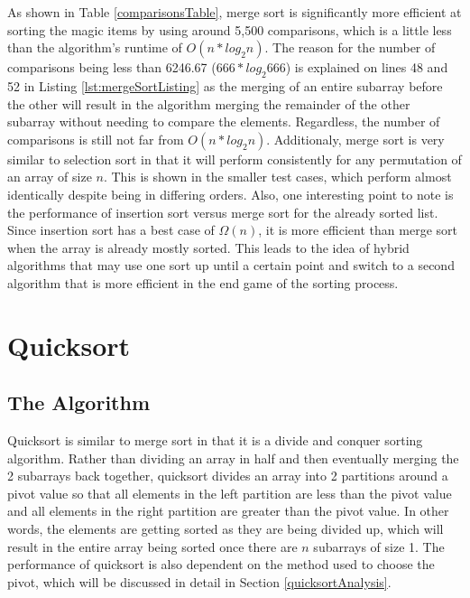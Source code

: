 \documentclass[letterpaper, 10pt,DIV=13]{scrartcl}
\numberwithin{equation}{section} %
\numberwithin{figure}{section} %
\numberwithin{table}{section} %
\begin{document}
As shown in Table \ref{comparisonsTable}, merge sort is significantly more efficient at sorting the magic items by using around 5,500 comparisons, which is a little less than the algorithm's runtime of $O(n * log_2n)$. The reason for the number of comparisons being less than 6246.67 ($666 * log_{2}666$) is explained on lines 48 and 52 in Listing \ref{lst:mergeSortListing} as the merging of an entire subarray before the other will result in the algorithm merging the remainder of the other subarray without needing to compare the elements. Regardless, the number of comparisons is still not far from $O(n * log_2n)$. Additionaly, merge sort is very similar to selection sort in that it will perform consistently for any permutation of an array of size $n$. This is shown in the smaller test cases, which perform almost identically despite being in differing orders. Also, one interesting point to note is the performance of insertion sort versus merge sort for the already sorted list. Since insertion sort has a best case of $\Omega(n)$, it is more efficient than merge sort when the array is already mostly sorted. This leads to the idea of hybrid algorithms that may use one sort up until a certain point and switch to a second algorithm that is more efficient in the end game of the sorting process.

\section{Quicksort}
\subsection{The Algorithm}\label{quicksortAlgo}
Quicksort is similar to merge sort in that it is a divide and conquer sorting algorithm. Rather than dividing an array in half and then eventually merging the 2 subarrays back together, quicksort divides an array into 2 partitions around a pivot value so that all elements in the left partition are less than the pivot value and all elements in the right partition are greater than the pivot value. In other words, the elements are getting sorted as they are being divided up, which will result in the entire array being sorted once there are $n$ subarrays of size 1. The performance of quicksort is also dependent on the method used to choose the pivot, which will be discussed in detail in Section \ref{quicksortAnalysis}.
\end{document}
